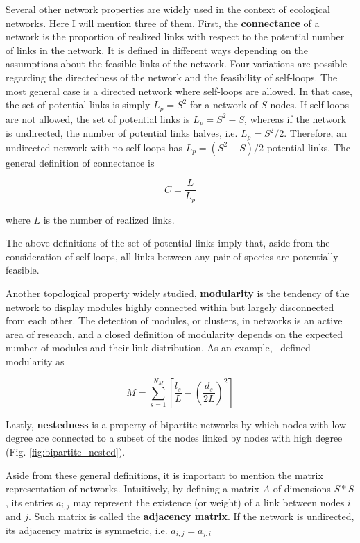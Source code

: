 Several other network properties are widely used in the context of ecological networks. Here I will mention three of them. First, the \textbf{connectance} of a network is the proportion of realized links with respect to the potential number of links in the network. It is defined in different ways depending on the assumptions about the feasible links of the network. Four variations are possible regarding the directedness of the network and the feasibility of self-loops. The most general case is a directed network where self-loops are allowed. In that case, the set of potential links is simply $L_p = S^2$ for a network of $S$ nodes. If self-loops are not allowed, the set of potential links is $L_p = S^2 - S$, whereas if the network is undirected, the number of potential links halves, i.e. $L_p = S^2/2$. Therefore, an undirected network with no self-loops has $L_p = (S^2 - S)/2$ potential links. The general definition of connectance is

\begin{equation}
C = \frac{L}{L_p}
\end{equation}

where $L$ is the number of realized links.

The above definitions of the set of potential links imply that, aside from the consideration of self-loops, all links between any pair of species are potentially feasible.

Another topological property widely studied, \textbf{modularity} is the tendency of the network to display modules highly connected within but largely disconnected from each other. The detection of modules, or clusters, in networks is an active area of research, and a closed definition of modularity depends on the expected number of modules and their link distribution. As an example,~\cite{Fortuna2010} defined modularity as

\begin{equation}
M = \sum_{s = 1}^{N_M} \left[\frac{l_s}{L} - \left(\frac{d_s}{2L}\right)^2\right]
\end{equation}

Lastly, \textbf{nestedness} is a property of bipartite networks by which nodes with low degree are connected to a subset of the nodes linked by nodes with high degree (Fig. \ref{fig:bipartite_nested}).

Aside from these general definitions, it is important to mention the matrix representation of networks. Intuitively, by defining a matrix $A$ of dimensions $S * S$, its entries $a_{i,j}$ may represent the existence (or weight) of a link between nodes $i$ and $j$. Such matrix is called the \textbf{adjacency matrix}. If the network is undirected, its adjacency matrix is symmetric, i.e. $a_{i,j} = a_{j,i}$

